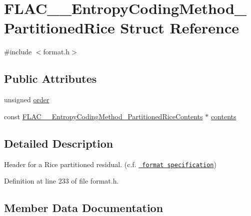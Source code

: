 \hypertarget{struct_f_l_a_c_____entropy_coding_method___partitioned_rice}{}\section{F\+L\+A\+C\+\_\+\+\_\+\+Entropy\+Coding\+Method\+\_\+\+Partitioned\+Rice Struct Reference}
\label{struct_f_l_a_c_____entropy_coding_method___partitioned_rice}


{\ttfamily \#include $<$format.\+h$>$}

\subsection*{Public Attributes}
\begin{DoxyCompactItemize}
\item 
unsigned \mbox{\hyperlink{struct_f_l_a_c_____entropy_coding_method___partitioned_rice_a1e1c9049e31eab5113c245164b2c694a}{order}}
\item 
const \mbox{\hyperlink{struct_f_l_a_c_____entropy_coding_method___partitioned_rice_contents}{F\+L\+A\+C\+\_\+\+\_\+\+Entropy\+Coding\+Method\+\_\+\+Partitioned\+Rice\+Contents}} $\ast$ \mbox{\hyperlink{struct_f_l_a_c_____entropy_coding_method___partitioned_rice_a2fbfa1bd5656bf620c0bb9f8ba77f579}{contents}}
\end{DoxyCompactItemize}


\subsection{Detailed Description}
Header for a Rice partitioned residual. (c.\+f. \href{../format.html\#partitioned_rice}{\texttt{ format specification}}) 

Definition at line 233 of file format.\+h.



\subsection{Member Data Documentation}
\mbox{\label{struct_f_l_a_c_____entropy_coding_method___partitioned_rice_a2fbfa1bd5656bf620c0bb9f8ba77f579}} 
